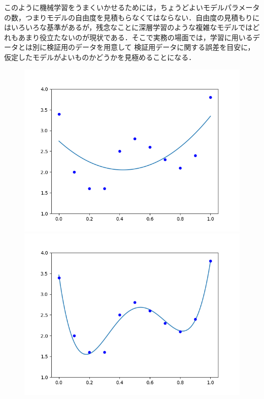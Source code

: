 \documentclass[a4paper,11pt]{jsreport}
\begin{document}
このように機械学習をうまくいかせるためには，ちょうどよいモデルパラメータの数，つまりモデルの自由度を見積もらなくてはならない．自由度の見積もりにはいろいろな基準があるが，残念なことに深層学習のような複雑なモデルではどれもあまり役立たないのが現状である．そこで実務の場面では，学習に用いるデータとは別に検証用のデータを用意して
検証用データに関する誤差を目安に，仮定したモデルがよいものかどうかを見極めることになる．
\begin{figure}[H]
  \begin{minipage}[b]{0.3\linewidth}
    \centering
    \includegraphics[keepaspectratio, scale=0.3]{image/多項式回帰(a).png}
  \end{minipage}
  \begin{minipage}[b]{0.3\linewidth}
    \centering
    \includegraphics[keepaspectratio, scale=0.3]{image/多項式回帰(b).png}

\end{minipage}
\end{figure}
\end{document}

